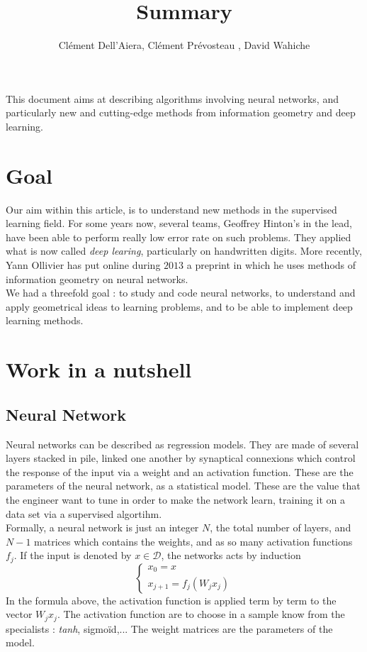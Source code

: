 \documentclass{article}
\title{Summary}
\author{Clément Dell'Aiera, Clément Prévosteau , David Wahiche}
\date{}
\begin{document}
\maketitle


This document aims at describing algorithms involving neural networks, and particularly new and cutting-edge methods from information geometry and deep learning.

\section{Goal}

Our aim within this article, is to understand new methods in the supervised learning field. For some years now, several teams, Geoffrey Hinton's in the lead, have been able to perform really low error rate on such problems. They applied what is now called \textit{deep learing}, particularly on handwritten digits. More recently, Yann Ollivier has put online during $2013$ a preprint in which he uses methods of information geometry on neural networks.\\

We had a threefold goal : to study and code neural networks, to understand and apply geometrical ideas to learning problems, and to be able to implement deep learning methods.


\section{Work in a nutshell}

\subsection{Neural Network}

Neural networks can be described as regression models. They are made of several layers stacked in pile, linked one another by synaptical connexions which control the response of the input via a weight and an activation function. These are the parameters of the neural network, as a statistical model. These are the value that the engineer want to tune in order to make the network learn, training it on a data set via a supervised algortihm.\\

Formally, a neural network is just an integer $N$, the total number of layers, and $N-1$ matrices which contains the weights, and as so many activation functions $f_j$. If the input is denoted by $x\in \mathcal D$, the networks acts by induction
\[\left\{\begin{array}{c}x_0=x\\ x_{j+1}=f_j(W_j x_j)\end{array}\right.\]
In the formula above, the activation function is applied term by term to the vector $W_j x_j$. The activation function are to choose in a sample know from the specialists : \textit{tanh}, sigmoïd,... The weight matrices are the parameters of the model.\\
\end{document}
